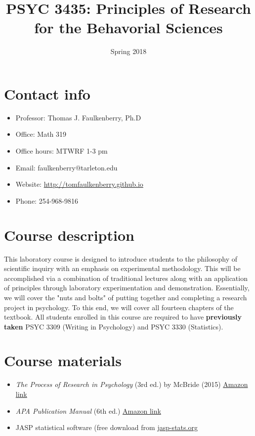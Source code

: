 \documentclass[10pt]{article}
\date{Spring 2018}
\title{PSYC 3435: Principles of Research for the Behavorial Sciences}
\begin{document}
\maketitle

\section*{Contact info}
\label{sec-1}
\begin{itemize}
\item Professor: Thomas J. Faulkenberry, Ph.D
\item Office: Math 319
\item Office hours: MTWRF 1-3 pm
\item Email: faulkenberry@tarleton.edu
\item Website: \url{http://tomfaulkenberry.github.io}
\item Phone: 254-968-9816
\end{itemize}

\section*{Course description}
\label{sec-2}

This laboratory course is designed to introduce students to the philosophy of scientific inquiry with an emphasis on experimental methodology. This will be accomplished via a combination of traditional lectures along with an application of principles through laboratory experimentation and demonstration. Essentially, we will cover the "nuts and bolts" of putting together and completing a research project in psychology. To this end, we will cover all fourteen chapters of the textbook. All students enrolled in this course are required to have \textbf{previously taken} PSYC 3309 (Writing in Psychology) and PSYC 3330 (Statistics). 

\section*{Course materials}
\label{sec-3}

\begin{itemize}
\item \emph{The Process of Research in Psychology} (3rd ed.) by McBride (2015) \href{https://www.amazon.com/Process-Research-Psychology-Dawn-McBride/dp/1483347605/}{Amazon link}
\item \emph{APA Publication Manual} (6th ed.) \href{http://www.amazon.com/Publication-Manual-American-Psychological-Association/dp/1433805618/}{Amazon link}
\item JASP statistical software (free download from \href{http://jasp-stats.org}{jasp-stats.org}
\end{itemize}
\end{document}
